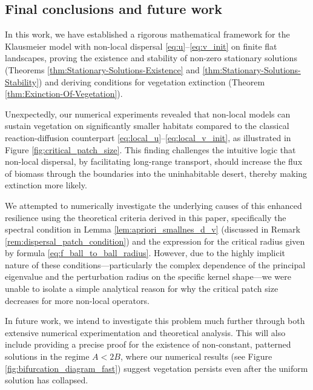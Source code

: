 \documentclass[preprint,12pt]{elsarticle}
\theoremstyle{plain}
\theoremstyle{definition}
\theoremstyle{remark}
\begin{document}
\subsection{Final conclusions and future work}

In this work, we have established a rigorous mathematical framework for the Klausmeier model with non-local dispersal \eqref{eq:u}--\eqref{eq:v_init} on finite flat landscapes, proving the existence and stability of non-zero stationary solutions (Theorems \ref{thm:Stationary-Solutions-Existence} and \ref{thm:Stationary-Solutions-Stability}) and deriving conditions for vegetation extinction (Theorem \ref{thm:Exinction-Of-Vegetation}). 

Unexpectedly, our numerical experiments revealed that non-local models can sustain vegetation on significantly smaller habitats compared to the classical reaction-diffusion counterpart \eqref{eq:local_u}--\eqref{eq:local_v_init}, as illustrated in Figure \ref{fig:critical_patch_size}.
This finding challenges the intuitive logic that non-local dispersal, by facilitating long-range transport, should increase the flux of biomass through the boundaries into the uninhabitable desert, thereby making extinction more likely.

We attempted to numerically investigate the underlying causes of this enhanced resilience using the theoretical criteria derived in this paper, specifically the spectral condition in Lemma \ref{lem:apriori_smallnes_d_v} (discussed in Remark \ref{rem:dispersal_patch_condition}) and the expression for the critical radius given by formula \eqref{eq:f_ball_to_ball_radius}. 
However, due to the highly implicit nature of these conditions—particularly the complex dependence of the principal eigenvalue and the perturbation radius on the specific kernel shape—we were unable to isolate a simple analytical reason for why the critical patch size decreases for more non-local operators.

In future work, we intend to investigate this problem much further through both extensive numerical experimentation and theoretical analysis. 
This will also include providing a precise proof for the existence of non-constant, patterned solutions in the regime $A < 2B$, where our numerical results (see Figure \ref{fig:bifurcation_diagram_fast}) suggest vegetation persists even after the uniform solution has collapsed.




\end{document}
